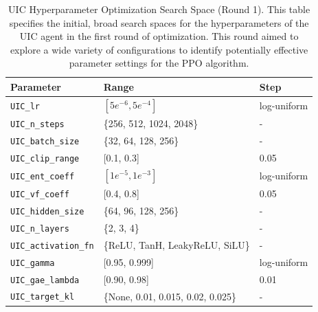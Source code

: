 \begin{table}[!htb]
    \centering
    \begin{tabular}{lll}
        \toprule
        \textbf{Parameter} & \textbf{Range} & \textbf{Step} \\
        \midrule
        \texttt{UIC\_lr}                 & $[5e^{-6}, 5e^{-4}]$      & log-uniform \\
        \texttt{UIC\_n\_steps}     & \{256, 512, 1024, 2048\}              & - \\
        \texttt{UIC\_batch\_size}     & \{32, 64, 128, 256\}              & - \\
        \texttt{UIC\_clip\_range}     & [0.1, 0.3]              & 0.05 \\
        \texttt{UIC\_ent\_coeff}     & $[1e^{-5}, 1e^{-3}]$              & log-uniform \\
        \texttt{UIC\_vf\_coeff}     & [0.4, 0.8]              & 0.05 \\
        \midrule
        \texttt{UIC\_hidden\_size}       & \{64, 96, 128, 256\}     & - \\
        \texttt{UIC\_n\_layers}        & \{2, 3, 4\}     & - \\
        \texttt{UIC\_activation\_fn}                & \{ReLU, TanH, LeakyReLU, SiLU\}            & - \\
        \midrule
        \texttt{UIC\_gamma}       & [0.95, 0.999]             & log-uniform\\
        \texttt{UIC\_gae\_lambda}         & [0.90, 0.98]                & 0.01\\
        \texttt{UIC\_target\_kl}   & \{None, 0.01, 0.015, 0.02, 0.025\}                & -\\
        \bottomrule
    \end{tabular}
    \caption{UIC Hyperparameter Optimization Search Space (Round 1). This table specifies the initial, broad search spaces for the hyperparameters of the UIC agent in the first round of optimization. This round aimed to explore a wide variety of configurations to identify potentially effective parameter settings for the PPO algorithm.}
    \label{tab:uic_ho_first_round}
\end{table}

